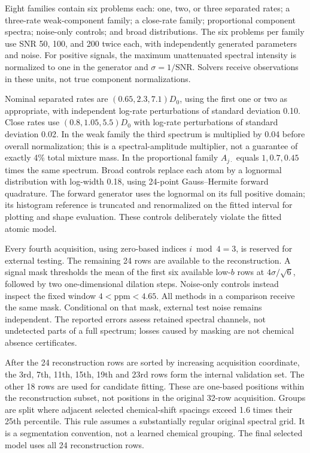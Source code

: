 Eight families contain six problems each: one, two, or three separated rates; a three-rate weak-component family; a close-rate family; proportional component spectra; noise-only controls; and broad distributions. The six problems per family use SNR 50, 100, and 200 twice each, with independently generated parameters and noise. For positive signals, the maximum unattenuated spectral intensity is normalized to one in the generator and $\sigma=1/\mathrm{SNR}$. Solvers receive observations in these units, not true component normalizations.

Nominal separated rates are $(0.65,2.3,7.1)D_0$, using the first one or two as appropriate, with independent log-rate perturbations of standard deviation 0.10. Close rates use $(0.8,1.05,5.5)D_0$ with log-rate perturbations of standard deviation 0.02. In the weak family the third spectrum is multiplied by 0.04 before overall normalization; this is a spectral-amplitude multiplier, not a guarantee of exactly 4\% total mixture mass. In the proportional family $A_{j\cdot}$ equals $1,0.7,0.45$ times the same spectrum. Broad controls replace each atom by a lognormal distribution with log-width 0.18, using 24-point Gauss--Hermite forward quadrature. The forward generator uses the lognormal on its full positive domain; its histogram reference is truncated and renormalized on the fitted interval for plotting and shape evaluation. These controls deliberately violate the fitted atomic model.

Every fourth acquisition, using zero-based indices $i\bmod4=3$, is reserved for external testing. The remaining 24 rows are available to the reconstruction. A signal mask thresholds the mean of the first six available low-$b$ rows at $4\sigma/\sqrt6$, followed by two one-dimensional dilation steps. Noise-only controls instead inspect the fixed window $4<\mathrm{ppm}<4.65$. All methods in a comparison receive the same mask. Conditional on that mask, external test noise remains independent. The reported errors assess retained spectral channels, not undetected parts of a full spectrum; losses caused by masking are not chemical absence certificates.

After the 24 reconstruction rows are sorted by increasing acquisition coordinate, the 3rd, 7th, 11th, 15th, 19th and 23rd rows form the internal validation set. The other 18 rows are used for candidate fitting. These are one-based positions within the reconstruction subset, not positions in the original 32-row acquisition. Groups are split where adjacent selected chemical-shift spacings exceed 1.6 times their 25th percentile. This rule assumes a substantially regular original spectral grid. It is a segmentation convention, not a learned chemical grouping. The final selected model uses all 24 reconstruction rows.

